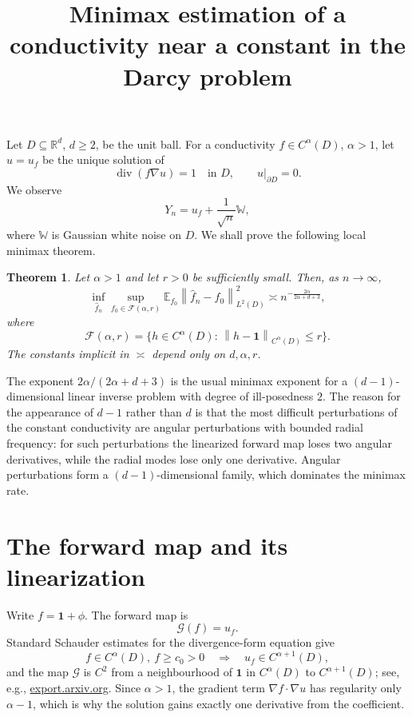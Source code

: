 \documentclass{article}
\title{Minimax estimation of a conductivity near a constant in the Darcy problem}
\date{}
\newtheorem{theorem}{Theorem}[section]
\theoremstyle{remark}
\newcommand{\R}{\mathbb R}
\newcommand{\E}{\mathbb E}
\newcommand{\W}{\mathbb W}
\newcommand{\cF}{\mathcal F}
\newcommand{\cG}{\mathcal G}
\newcommand{\norm}[1]{\left\|#1\right\|}
\newcommand{\one}{\mathbf 1}
\begin{document}
\maketitle

\noindent
Let \(D\subseteq \R^d\), \(d\ge 2\), be the unit ball. For a conductivity
\(f\in C^\alpha(D)\), \(\alpha>1\), let \(u=u_f\) be the unique solution of
\[
\operatorname{div}(f\nabla u)=1\quad \text{in }D,\qquad u|_{\partial D}=0.
\]
We observe
\[
Y_n=u_f+\frac1{\sqrt n}\W,
\]
where \(\W\) is Gaussian white noise on \(D\). We shall prove the following local minimax theorem.

\begin{theorem}\label{thm:main}
Let \(\alpha>1\) and let \(r>0\) be sufficiently small. Then, as \(n\to\infty\),
\[
\inf_{\hat f_n}\sup_{f_0\in \cF(\alpha,r)}
\E_{f_0}\norm{\hat f_n-f_0}_{L^2(D)}^2
\asymp n^{-\frac{2\alpha}{2\alpha+d+3}},
\]
where
\[
\cF(\alpha,r)=\bigl\{h\in C^\alpha(D):\, \norm{h-\one}_{C^\alpha(D)}\le r\bigr\}.
\]
The constants implicit in \(\asymp\) depend only on \(d,\alpha,r\).
\end{theorem}

The exponent \(2\alpha/(2\alpha+d+3)\) is the usual minimax exponent for a \((d-1)\)-dimensional linear inverse problem with degree of ill-posedness \(2\). The reason for the appearance of \(d-1\) rather than \(d\) is that the most difficult perturbations of the constant conductivity are angular perturbations with bounded radial frequency: for such perturbations the linearized forward map loses two angular derivatives, while the radial modes lose only one derivative. Angular perturbations form a \((d-1)\)-dimensional family, which dominates the minimax rate.

\section{The forward map and its linearization}

Write \(f=\one+\phi\). The forward map is
\[
\cG(f)=u_f .
\]
Standard Schauder estimates for the divergence-form equation give
\[
f\in C^\alpha(D),\ f\ge c_0>0
\quad\Longrightarrow\quad
u_f\in C^{\alpha+1}(D),
\]
and the map \(\cG\) is \(C^2\) from a neighbourhood of \(\one\) in \(C^\alpha(D)\) to \(C^{\alpha+1}(D)\); see, e.g., \href{https://export.arxiv.org/pdf/1809.08818v3.pdf}{export.arxiv.org}. Since \(\alpha>1\), the gradient term \(\nabla f\cdot \nabla u\) has regularity only \(\alpha-1\), which is why the solution gains exactly one derivative from the coefficient.
\end{document}
